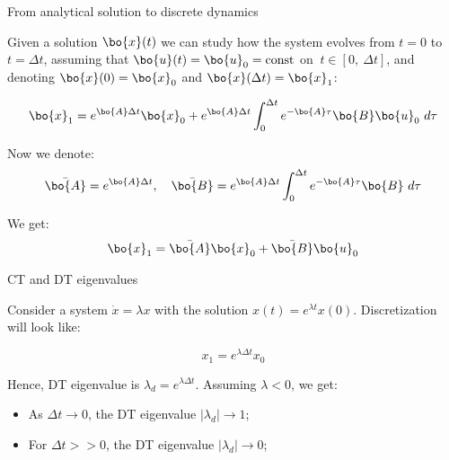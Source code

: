 \documentclass{beamer}
\begin{document}
\begin{frame}{From analytical solution to discrete dynamics}
	\begin{flushleft}
		
		Given a solution $\bo{x}(t)$ we can study how the system evolves from $t=0$ to $t=\Delta t$, assuming that $\bo{u}(t) = \bo{u}_0 = \text{const}$ on $\ t \in [ 0, \ \Delta t ]$, and denoting $\bo{x}(0) = \bo{x}_0$ and $\bo{x}(\Delta t) = \bo{x}_1$:
		
		\begin{equation}
			\bo{x}_1 = e^{\bo{A}\Delta t}  \bo{x}_0 + 
			e^{\bo{A} \Delta t} \int_{0}^{\Delta t} e^{-\bo{A}\tau} \bo{B}  \bo{u}_0 \ d \tau
		\end{equation}
		
		Now we denote:
		\begin{align}
			\bar{\bo{A}} = e^{\bo{A}\Delta t}, \ \ \
			\bar{\bo{B}} = e^{\bo{A} \Delta t} \int_{0}^{\Delta t} e^{-\bo{A}\tau} \bo{B} \ d\tau
		\end{align}
	
		We get:
		\begin{equation}
			\bo{x}_1 = \bar{\bo{A}}  \bo{x}_0 + \bar{\bo{B}}  \bo{u}_0
		\end{equation}		
		
	\end{flushleft}
\end{frame}






\begin{frame}{CT and DT eigenvalues}
	\begin{flushleft}
		
		Consider a system $\dot{x} = \lambda x$ with the solution $x(t) = e^{ \lambda t} x(0)$. Discretization will look like:
		
		\begin{equation}
			x_1 =e^{ \lambda \Delta t}   x_0 
		\end{equation}
		
		Hence, DT eigenvalue is $\lambda_d = e^{ \lambda \Delta t} $. Assuming $\lambda < 0$, we get:
		
		\begin{itemize}
			\item As $\Delta t \rightarrow 0$, the DT eigenvalue $|\lambda_d| \rightarrow 1$;
			
			\item For $\Delta t >> 0$, the DT eigenvalue $|\lambda_d| \rightarrow 0$;
		\end{itemize}
		
	\end{flushleft}
\end{frame}
\end{document}
